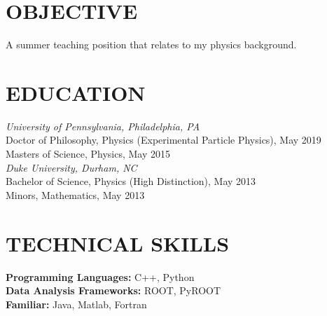 \documentclass{res}
\begin{document}
\begin{resume}

\section{OBJECTIVE}          
    A summer teaching position that relates to my physics background.          
 
\section{EDUCATION}          
    {\it University of Pennsylvania, Philadelphia, PA} \\
    Doctor of Philosophy, Physics (Experimental Particle Physics), May 2019 \\
    Masters of Science, Physics, May 2015 \\
    \newline
    {\it Duke University, Durham, NC} \\        
    Bachelor of Science, Physics (High Distinction), May 2013   \\       
    Minors, Mathematics, May 2013 
 
\section{TECHNICAL SKILLS}
    {\bf Programming Languages:} C++, Python\\
    {\bf Data Analysis Frameworks:} ROOT, PyROOT\\
    {\bf Familiar:} Java, Matlab, Fortran


\end{resume}
\end{document}
